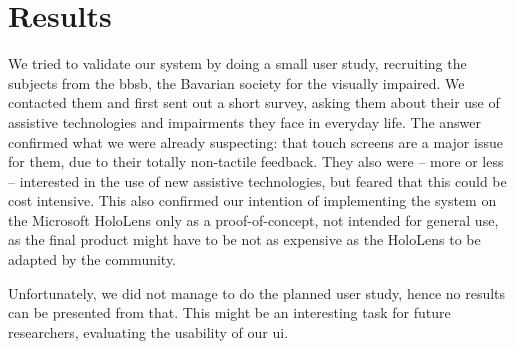 \section{Results}
We tried to validate our system by doing a small user study, recruiting the subjects from the \ac{bbsb}, the Bavarian society for the visually impaired.
We contacted them and first sent out a short survey, asking them about their use of assistive technologies and impairments they face in everyday life.
The answer confirmed what we were already suspecting: that touch screens are a major issue for them, due to their totally non-tactile feedback.
They also were -- more or less -- interested in the use of new assistive technologies, but feared that this could be cost intensive.
This also confirmed our  intention of implementing the system on the Microsoft HoloLens only as a proof-of-concept, not intended for general use, as the final product might have to be not as expensive as the HoloLens to be adapted by the community.

Unfortunately, we did not manage to do the planned user study, hence no results can be presented from that.
This might be an interesting task for future researchers, evaluating the usability of our \ac{ui}.

